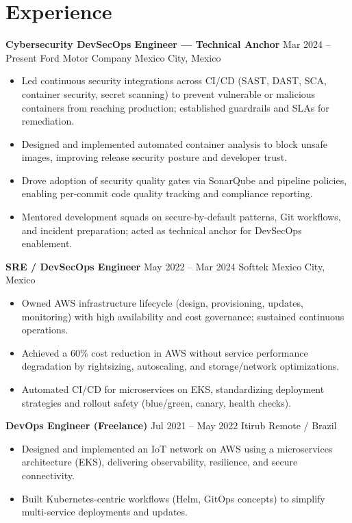 \documentclass[11pt,a4paper]{article}
\newcommand{\role}[2]{\textbf{#1} \hfill {\small #2}}%
\newcommand{\org}[2]{{#1} \hfill {\small #2}}%
\begin{document}
\section*{Experience}
\role{Cybersecurity DevSecOps Engineer — Technical Anchor}{Mar 2024 -- Present}
\org{Ford Motor Company}{Mexico City, Mexico}
\begin{itemize}
  \item Led continuous security integrations across CI/CD (SAST, DAST, SCA, container security, secret scanning) to prevent vulnerable or malicious containers from reaching production; established guardrails and SLAs for remediation.
  \item Designed and implemented automated container analysis to block unsafe images, improving release security posture and developer trust.
  \item Drove adoption of security quality gates via SonarQube and pipeline policies, enabling per-commit code quality tracking and compliance reporting.
  \item Mentored development squads on secure-by-default patterns, Git workflows, and incident preparation; acted as technical anchor for DevSecOps enablement.
\end{itemize}

\role{SRE / DevSecOps Engineer}{May 2022 -- Mar 2024}
\org{Softtek}{Mexico City, Mexico}
\begin{itemize}
  \item Owned AWS infrastructure lifecycle (design, provisioning, updates, monitoring) with high availability and cost governance; sustained continuous operations.
  \item Achieved a 60\% cost reduction in AWS without service performance degradation by rightsizing, autoscaling, and storage/network optimizations.
  \item Automated CI/CD for microservices on EKS, standardizing deployment strategies and rollout safety (blue/green, canary, health checks).
\end{itemize}

\role{DevOps Engineer (Freelance)}{Jul 2021 -- May 2022}
\org{Itirub}{Remote / Brazil}
\begin{itemize}
  \item Designed and implemented an IoT network on AWS using a microservices architecture (EKS), delivering observability, resilience, and secure connectivity.
  \item Built Kubernetes-centric workflows (Helm, GitOps concepts) to simplify multi-service deployments and updates.
\end{itemize}
\end{document}
